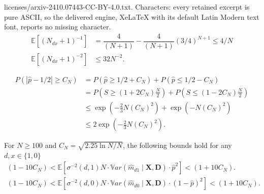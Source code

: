 \documentclass[10pt,a4paper]{amsart}
\newcommand{\E}{\mathbb{E}}
\newcommand{\Var}{\mathbb{V}ar}
\begin{document}
licenses/arxiv-2410.07443-CC-BY-4.0.txt. Characters: every retained excerpt is pure ASCII, so the delivered engine, XeLaTeX with its default Latin Modern text font, reports no missing character.
\begin{align}
\E [  (N_{dx} + 1)^{-1}   ] & = \dfrac{4}{(N+1) } - \dfrac{4}{(N+1)  } (3/4)^{N+1}  \leq 4/N \label{eq:mean1} \\
 \E [   (N_{dx} + 1)^{-2}   ]   & \leq 32  N^{-2}. \label{eq:mean3}
\end{align} 

\begin{equation} \label{eq:chernoff}
\begin{array}{cl}
	P\left(\left|\hat{p} - 1/2\right| \geq C_N\right) &= P(\hat{p} \geq 1/2 + C_N) + P(\hat{p} \leq 1/2 - C_N)\\[3mm]
	&= P(S \geq (1 + 2C_N)\frac{N}{2}) + P(S \leq (1-2C_N)\frac{N}{2})\\[3mm]
	&\leq \exp \left(-\frac{2}{3}N(C_N)^2 \right) + \exp\left(-N(C_N)^2 \right)\\[3mm]
	&\leq 2\exp \left(-\frac{2}{3}N(C_N)^2 \right).
\end{array}
\end{equation}

 \begin{lemma}
   \label{lem:bias}
 For $N \geq 100$ and $C_N = \sqrt{2.25 \ln N/N}$, the following bounds hold for any $d,x \in \{1,0\}$
\begin{align}
 (1-10 C_N) < \E [\sigma^{-2}(d,1)  N \cdot \Var ( \widehat m_{d1} \mid \mathbf{X}, \mathbf{D})\cdot    \widehat{p}^2] <  (1+ 10 C_N). \label{eq:varbound} \\
(1-10 C_N) <   \E [\sigma^{-2}(d,0) N \cdot \Var ( \widehat m_{d0} \mid \mathbf{X}, \mathbf{D})   \cdot (1-\widehat{p})^2] < (1+ 10 C_N). \label{eq:varbound2} 
\end{align}
\end{lemma}
\end{document}
